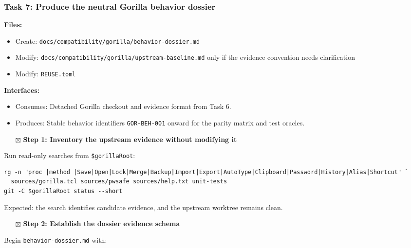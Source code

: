 \documentclass[
  letterpaper,
]{article}
\providecommand{\tightlist}{%
  \setlength{\itemsep}{0pt}\setlength{\parskip}{0pt}}
\begin{document}
\subsubsection{Task 7: Produce the neutral Gorilla behavior
dossier}\label{task-7-produce-the-neutral-gorilla-behavior-dossier}

\textbf{Files:}

\begin{itemize}
\tightlist
\item
  Create: \nolinkurl{docs/compatibility/gorilla/behavior-dossier.md}
\item
  Modify: \nolinkurl{docs/compatibility/gorilla/upstream-baseline.md} only if the evidence convention needs
  clarification
\item
  Modify: \nolinkurl{REUSE.toml}
\end{itemize}

\textbf{Interfaces:}

\begin{itemize}
\tightlist
\item
  Consumes: Detached Gorilla checkout and evidence format from Task 6.
\item
  Produces: Stable behavior identifiers \nolinkurl{GOR-BEH-001} onward for the parity matrix and test oracles.
\end{itemize}

\begin{itemize}
\tightlist
\item[$\boxtimes$]
  \textbf{Step 1: Inventory the upstream evidence without modifying it}
\end{itemize}

Run read-only searches from \nolinkurl{$gorillaRoot}:

\begin{lstlisting}
rg -n "proc |method |Save|Open|Lock|Merge|Backup|Import|Export|AutoType|Clipboard|Password|History|Alias|Shortcut" `
  sources/gorilla.tcl sources/pwsafe sources/help.txt unit-tests
git -C $gorillaRoot status --short
\end{lstlisting}

Expected: the search identifies candidate evidence, and the upstream worktree remains clean.

\begin{itemize}
\tightlist
\item[$\boxtimes$]
  \textbf{Step 2: Establish the dossier evidence schema}
\end{itemize}

Begin \nolinkurl{behavior-dossier.md} with:
\end{document}
